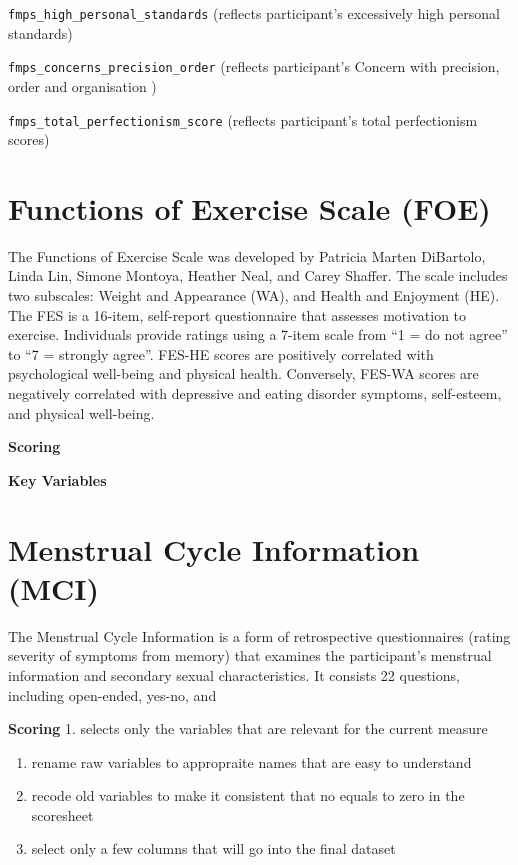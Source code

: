 \documentclass[
]{book}
\begin{document}
\texttt{fmps\_high\_personal\_standards} (reflects participant's excessively high
personal standards)

\texttt{fmps\_concerns\_precision\_order} (reflects participant's Concern with
precision, order and organisation )

\texttt{fmps\_total\_perfectionism\_score} (reflects participant's total
perfectionism scores)

\section{Functions of Exercise Scale (FOE)}\label{functions-of-exercise-scale-foe}

The Functions of Exercise Scale was developed by Patricia Marten
DiBartolo, Linda Lin, Simone Montoya, Heather Neal, and Carey Shaffer.
The scale includes two subscales: Weight and Appearance (WA), and Health
and Enjoyment (HE). The FES is a 16-item, self-report questionnaire that
assesses motivation to exercise. Individuals provide ratings using a
7-item scale from ``1 = do not agree'' to ``7 = strongly agree''. FES-HE
scores are positively correlated with psychological well-being and
physical health. Conversely, FES-WA scores are negatively correlated
with depressive and eating disorder symptoms, self-esteem, and physical
well-being.

\textbf{Scoring}

\textbf{Key Variables}

\section{Menstrual Cycle Information (MCI)}\label{menstrual-cycle-information-mci}

The Menstrual Cycle Information is a form of retrospective
questionnaires (rating severity of symptoms from memory) that examines
the participant's menstrual information and secondary sexual
characteristics. It consists 22 questions, including open-ended, yes-no,
and

\textbf{Scoring} 1. selects only the variables that are relevant for the
current measure

\begin{enumerate}
\def\labelenumi{\arabic{enumi}.}
\setcounter{enumi}{1}
\item
  rename raw variables to appropraite names that are easy to
  understand
\item
  recode old variables to make it consistent that no equals to zero in
  the scoresheet
\item
  select only a few columns that will go into the final dataset
\end{enumerate}
\end{document}
